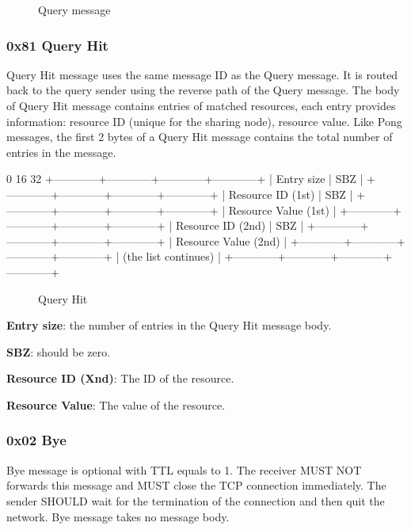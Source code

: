 \documentclass[12pt, a4paper]{article}
\begin{document}
\begin{figure}[h!]
  \centering
  \theverbbox
  \label{header}
  \caption{Query message}
\end{figure}


\subsubsection{0x81 Query Hit}
Query Hit message uses the same message ID as the Query message.
It is routed back to the query sender using the reverse path of the Query message.
The body of Query Hit message contains entries of matched resources, each entry provides information: resource ID (unique for the sharing node), resource value.
Like Pong messages, the first 2 bytes of a Query Hit message contains the total number of entries in the message.

\begin{verbbox}
0                          16                        32
+------------+------------+------------+------------+
|        Entry size       |           SBZ           |
+------------+------------+------------+------------+
|    Resource ID (1st)    |           SBZ           |
+------------+------------+------------+------------+
|                Resource Value (1st)               |
+------------+------------+------------+------------+
|    Resource ID (2nd)    |           SBZ           |
+------------+------------+------------+------------+
|                Resource Value (2nd)               |
+------------+------------+------------+------------+
|    (the list continues)                           |
+------------+------------+------------+------------+
\end{verbbox}
\begin{figure}[h!]
  \centering
  \theverbbox
  \label{header}
  \caption{Query Hit}
\end{figure}

\textbf{Entry size}: the number of entries in the Query Hit message body.

\textbf{SBZ}: should be zero.

\textbf{Resource ID (Xnd)}: The ID of the resource.

\textbf{Resource Value}: The value of the resource.

\subsubsection{0x02 Bye}
Bye message is optional with TTL equals to 1.
The receiver MUST NOT forwards this message and MUST close the TCP connection immediately.
The sender SHOULD wait for the termination of the connection and then quit the network.
Bye message takes no message body.
\end{document}
